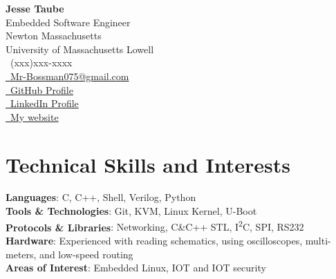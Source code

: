 \documentclass[a4paper,11pt]{article}
\makeatletter
\newcommand{\phone}{(xxx)xxx-xxxx}
\newcommand{\email}{Mr-Bossman075@gmail.com}
\makeatother
\begin{document}
\selectfont
{
\begin{multicols}{2}
	\textbf{\Large Jesse Taube} \\
	{{\footnotesize \faMicrochip} Embedded Software Engineer} \\
	{{\footnotesize \faMapMarker} Newton Massachusetts} \\
	{{\footnotesize \faGraduationCap} University of Massachusetts Lowell} \\
	\vfill\null
	\RaggedLeft
	{\raisebox{0.0\height}{\footnotesize \faPhone}\ \phone} \\
	{\href{mailto:\email}{\raisebox{0.0\height}{\footnotesize \faEnvelope}\ {\email}}} \\
	{\href{https://github.com/Mr-Bossman}{\raisebox{0.0\height}{\footnotesize \faGithub}\ {GitHub Profile}}} \\
	{\href{https://www.linkedin.com/in/jesse-taube-749351229/}{\raisebox{0.0\height}{\footnotesize \faLinkedin}\ {LinkedIn Profile}}} \\
	{\href{https://jachan.dev}{\raisebox{0.0\height}{\footnotesize \faGlobe}\ {My website}}}
\end{multicols}
}
\vspace{-3mm}

\section{\textbf{Technical Skills and Interests}}
\begin{itemize}[leftmargin=0.05in, label={}]
		\small{\item{
		 \textbf{Languages}{: C, C++, Shell, Verilog, Python} \\
		 \textbf{Tools \& Technologies}{: Git, KVM, Linux Kernel, U-Boot} \\
		 \textbf{Protocols \& Libraries}{: Networking, C\&C++ STL, I\textsuperscript{2}C, SPI, RS232}\\
		 \textbf{Hardware}{: Experienced with reading schematics, using oscilloscopes, multi-meters, and low-speed routing} \\
		 \textbf{Areas of Interest}{: Embedded Linux, IOT and IOT security} \\
		}}
\end{itemize}
\vspace{-16pt}
\end{document}
